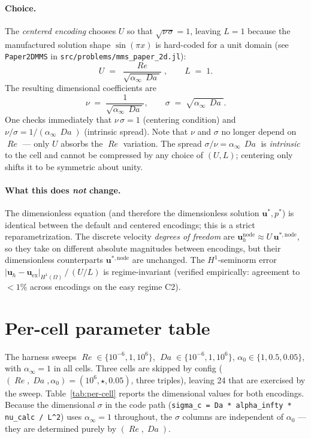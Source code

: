 \documentclass[11pt]{article}
\newcommand{\Reyn}{\operatorname{\mathit{Re}}}
\newcommand{\Damk}{\operatorname{\mathit{Da}}}
\begin{document}
\paragraph{Choice.}
The \emph{centered encoding} chooses $U$ so that
$\sqrt{\nu\,\sigma} = 1$, leaving $L = 1$ because the manufactured solution
shape $\sin(\pi x)$ is hard-coded for a unit domain (see
\texttt{Paper2DMMS} in \texttt{src/problems/mms\_paper\_2d.jl}):
\begin{equation}
  \boxed{\;\;
    U \;=\; \frac{\Reyn}{\sqrt{\alpha_\infty\,\Damk}},
    \qquad
    L \;=\; 1.
  \;\;}
\end{equation}
The resulting dimensional coefficients are
\begin{equation}
  \nu \;=\; \frac{1}{\sqrt{\alpha_\infty\,\Damk}},
  \qquad
  \sigma \;=\; \sqrt{\alpha_\infty\,\Damk}.
\end{equation}
One checks immediately that
$\nu\,\sigma = 1$ (centering condition) and
$\nu/\sigma = 1/(\alpha_\infty\,\Damk)$ (intrinsic spread).
Note that $\nu$ and $\sigma$ no longer depend on $\Reyn$ — only $U$ absorbs
the $\Reyn$ variation. The spread
$\sigma / \nu = \alpha_\infty\,\Damk$ is \emph{intrinsic} to the cell and
cannot be compressed by any choice of $(U, L)$; centering only shifts it
to be symmetric about unity.

\paragraph{What this does \emph{not} change.}
The dimensionless equation (and therefore the dimensionless solution
$\boldsymbol{u}^*, p^*$) is identical between the default and centered
encodings; this is a strict reparametrization. The discrete velocity
\emph{degrees of freedom} are
$\boldsymbol{u}_h^{\mathrm{node}} \approx U\,\boldsymbol{u}^{*,\mathrm{node}}$,
so they take on different absolute magnitudes between encodings, but their
dimensionless counterparts $\boldsymbol{u}^{*,\mathrm{node}}$ are unchanged.
The $H^1$-seminorm error
$|\boldsymbol{u}_h - \boldsymbol{u}_{\mathrm{ex}}|_{H^1(\Omega)}\,/\,(U/L)$
is regime-invariant (verified empirically: agreement to $<\!1\%$ across
encodings on the easy regime C2).

\section{Per-cell parameter table}

The harness sweeps $\Reyn \in \{10^{-6}, 1, 10^{6}\}$,
$\Damk \in \{10^{-6}, 1, 10^{6}\}$,
$\alpha_0 \in \{1, 0.5, 0.05\}$, with $\alpha_\infty = 1$ in all cells.
Three cells are skipped by config
($(\Reyn, \Damk, \alpha_0) = (10^{6}, \star, 0.05)$, three triples),
leaving 24 that are exercised by the sweep. Table~\ref{tab:per-cell}
reports the dimensional values for both encodings. Because the dimensional
$\sigma$ in the code path
(\texttt{sigma\_c = Da * alpha\_infty * nu\_calc / L\^{}2}) uses
$\alpha_\infty = 1$ throughout, the $\sigma$ columns are independent of
$\alpha_0$ — they are determined purely by $(\Reyn, \Damk)$.
\end{document}
